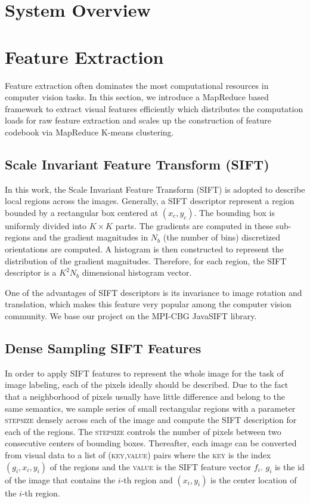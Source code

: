 \documentclass{sig-alternate}
\begin{document}
\section{System Overview}\label{sec:overview}

\section{Feature Extraction}\label{sec:feature}
Feature extraction often dominates the most computational resources in computer vision tasks. In this section, we introduce a MapReduce based framework to extract visual features efficiently which distributes the computation loads for raw feature extraction and scales up the construction of feature codebook via MapReduce K-means clustering.
\subsection{Scale Invariant Feature Transform (SIFT)}
In this work, the Scale Invariant Feature Transform (SIFT) \cite{sift} is adopted to describe local regions across the images. Generally, a SIFT descriptor represent a region bounded by a rectangular box centered at $(x_c,y_c)$. The bounding box is uniformly divided into $K\times K$ parts. The gradients are computed in these sub-regions and the gradient magnitudes in $N_b$ (the number of bins) discretized orientations  are computed. A histogram is then constructed to represent the distribution of the gradient magnitudes. Therefore, for each region, the SIFT descriptor is a $K^2N_b$ dimensional histogram vector.

One of the advantages of SIFT descriptors is its invariance to image rotation and translation, which makes this feature very popular among the computer vision community. We base our project on the MPI-CBG JavaSIFT library\cite{mpicbg}.
\subsection{Dense Sampling SIFT Features}
In order to apply SIFT features to represent the whole image for the task of image labeling, each of the pixels ideally should be described. Due to the fact that a neighborhood of pixels usually have little difference and belong to the same semantics, we sample series of small rectangular regions with a parameter \textsc{stepsize} densely across each of the image and compute the SIFT description for each of the regions. The \textsc{stepsize} controls the number of pixels between two consecutive centers of bounding boxes. Thereafter, each image can be converted from visual data to a list of \textsc{(key,value)} pairs where the \textsc{key} is the index $(g_i,x_i,y_i)$ of the regions and the \textsc{value} is the SIFT feature vector $f_i$. $g_i$ is the id of the image that contains the $i$-th region and $(x_i,y_i)$ is the center location of the $i$-th region.
\end{document}
